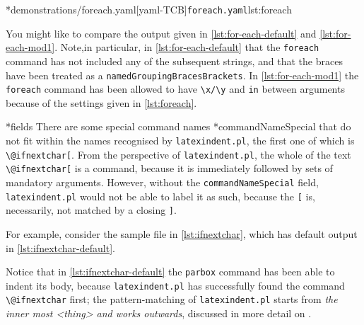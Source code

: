 	\begin{cmhtcbraster}[raster column skip=.1\linewidth]
		\cmhlistingsfromfile[style=yaml-LST]*{demonstrations/foreach.yaml}[yaml-TCB]{\texttt{foreach.yaml}}{lst:foreach}
	\end{cmhtcbraster}

	You might like to compare the output given in \cref{lst:for-each-default} and
	\cref{lst:for-each-mod1}. Note,in particular, in \cref{lst:for-each-default} that the
	\texttt{foreach} command has not included any of the subsequent strings, and that the
	braces have been treated as a \texttt{namedGroupingBracesBrackets}. In
	\cref{lst:for-each-mod1} the \texttt{foreach} command has been allowed to have
	\lstinline!\x/\y! and \texttt{in} between arguments because of the settings given
	in \cref{lst:foreach}.

*{fields}
	There are some special command names%
	*{commandNameSpecial} that do not fit within the names recognised by
	\texttt{latexindent.pl}, the first one of which is \lstinline!\@ifnextchar[!. From the
	perspective of \texttt{latexindent.pl}, the whole of the text \lstinline!\@ifnextchar[!
	is a command, because it is immediately followed by sets of mandatory arguments. However,
	without the \texttt{commandNameSpecial} field, \texttt{latexindent.pl} would not be able
	to label it as such, because the \lstinline![! is, necessarily, not matched by a closing
	\lstinline!]!.

	For example, consider the sample file in \cref{lst:ifnextchar}, which has default output
	in \cref{lst:ifnextchar-default}.

	\begin{cmhtcbraster}[raster column skip=.1\linewidth]
	\end{cmhtcbraster}

	Notice that in \cref{lst:ifnextchar-default} the \texttt{parbox} command has been able to
	indent its body, because \texttt{latexindent.pl} has successfully found the command
	\lstinline!\@ifnextchar! first; the pattern-matching of \texttt{latexindent.pl} starts
	from \emph{the inner most <thing> and works outwards}, discussed in more detail on
	.

